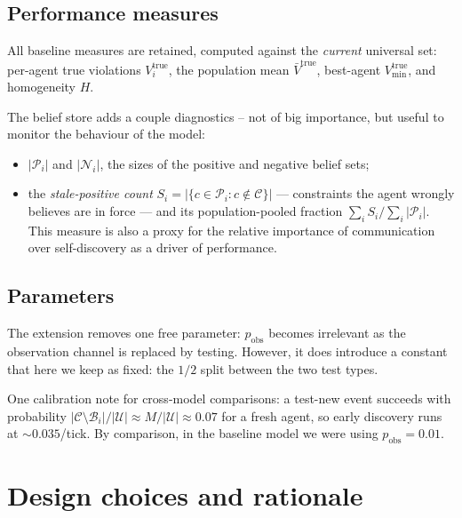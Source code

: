 \documentclass{article}
\begin{document}
\subsection{Performance measures}

All baseline measures are retained, computed against the \emph{current} universal set: per-agent true violations $V^{\text{true}}_i$, the population mean $\bar V^{\text{true}}$, best-agent $V^{\text{true}}_{\min}$, and homogeneity $H$. 

The belief store adds a couple diagnostics -- not of big importance, but useful to monitor the behaviour of the model:
\begin{itemize}
  \item $|\mathcal{P}_i|$ and $|\mathcal{N}_i|$, the sizes of the positive and negative belief sets;
  \item the \emph{stale-positive count} $S_i = |\{ c \in \mathcal{P}_i : c \notin \mathcal{C} \}|$ --- constraints the agent wrongly believes are in force --- and its population-pooled fraction $\sum_i S_i / \sum_i |\mathcal{P}_i|$. This measure is also a proxy for the relative importance of communication over self-discovery as a driver of performance.
\end{itemize}

\subsection{Parameters}

The extension removes one free parameter: $p_{\text{obs}}$ becomes irrelevant as the observation channel is replaced by testing. However, it does introduce a constant that here we keep as fixed: the $1/2$ split between the two test types.

One calibration note for cross-model comparisons: a test-new event succeeds with probability $|\mathcal{C} \setminus \mathcal{B}_i| / |\mathcal{U}| \approx M/|\mathcal{U}| \approx 0.07$ for a fresh agent, so early discovery runs at ${\sim}0.035$/tick. By comparison, in the baseline model we were using $p_{\text{obs}} = 0.01$.


\section{Design choices and rationale}\label{sec:design}
\end{document}
